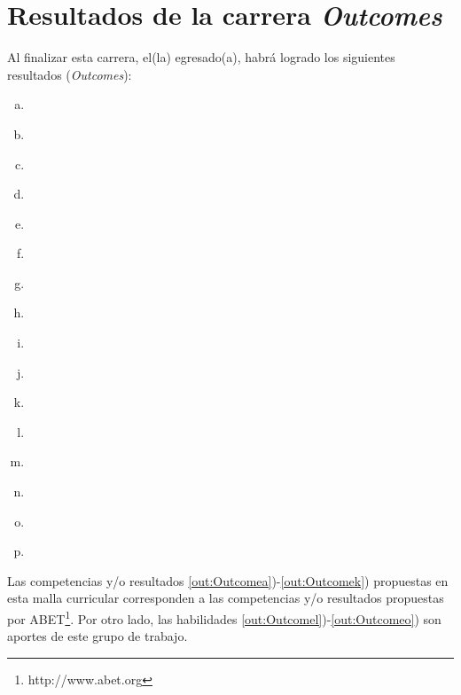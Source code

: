 \section{Resultados de la carrera \textit{Outcomes}}\label{sec:outcomes}
Al finalizar esta carrera, el(la) egresado(a), habrá  logrado los siguientes resultados (\textit{Outcomes}):

\begin{enumerate}[a)]
\item {}\label{out:Outcomea}
\item {}\label{out:Outcomeb}
\item {}\label{out:Outcomec}
\item {}\label{out:Outcomed}
\item {}\label{out:Outcomee}
\item {}\label{out:Outcomef}
\item {}\label{out:Outcomeg}
\item {}\label{out:Outcomeh}
\item {}\label{out:Outcomei}
\item {}\label{out:Outcomej}
\item {}\label{out:Outcomek}
\item {}\label{out:Outcomel}
\item {}\label{out:Outcomem}
\item {}\label{out:Outcomen}
\item {}\label{out:Outcomeñ}
\item {}\label{out:Outcomeo}
\end{enumerate}

Las competencias y/o resultados \ref{out:Outcomea})-\ref{out:Outcomek}) propuestas en esta malla curricular corresponden a las 
competencias y/o resultados propuestas por ABET\footnote{http://www.abet.org}.
Por otro lado, las habilidades \ref{out:Outcomel})-\ref{out:Outcomeo}) son aportes de este grupo de trabajo.